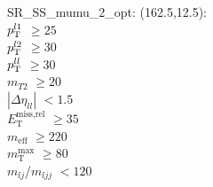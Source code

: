 SR\_SS\_mumu\_2\_opt: (162.5,12.5): \\
$p_{\text{T}}^{l1}$ $\geq 25$ \\
$p_{\text{T}}^{l2}$ $\geq 30$ \\
$p_{\text{T}}^{ll}$ $\geq 30$ \\
$m_{T2}$ $\geq 20$ \\
$|\Delta\eta_{ll}|$ $<1.5$ \\
$E_{\text{T}}^{\text{miss,rel}}$ $\geq 35$ \\
$m_{\text{eff}}$ $\geq 220$ \\
$m_{\text{T}}^{\text{max}}$ $\geq 80$ \\
$m_{lj}$/$m_{ljj}$ $<120$ \\
